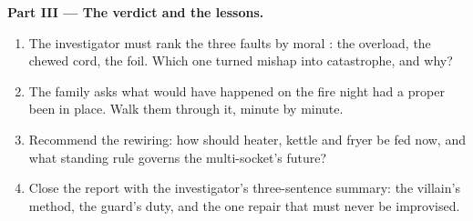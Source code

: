 \begin{problem}
\medskip\noindent\textbf{Part III --- The verdict and the
lessons.}
\begin{enumerate}[resume]
  \item The investigator must rank the three faults by moral
        : the overload, the chewed cord, the foil. Which
        one turned mishap into catastrophe, and why?
  \item The family asks what would have happened on the fire
        night had a proper  been in place. Walk them
        through it, minute by minute.
  \item Recommend the rewiring: how should heater, kettle and
        fryer be fed now, and what standing rule governs the
        multi-socket's future?
  \item Close the report with the investigator's three-sentence
        summary: the villain's method, the guard's duty, and
        the one repair that must never be improvised.
\end{enumerate}
\end{problem}
